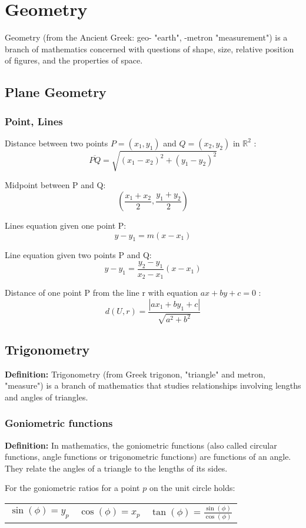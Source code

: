 \chapter{Geometry}
Geometry (from the Ancient Greek: geo- "earth", -metron "measurement") is a branch of mathematics concerned with questions of shape, size, relative position of figures, and the properties of space.


\section{Plane Geometry}
\subsection{Point, Lines}
Distance between two points $P=(x_1,y_1)$ and $Q=(x_2,y_2)$ in $\mathbb{R}^2$ : 
\[ \overline{PQ} = \sqrt{(x_1-x_2)^2+(y_1-y_2)^2} \]

Midpoint between P and Q: 
\[ \left(\frac{x_1+x_2}{2},\frac{y_1+y_2}{2}\right) \]

Lines equation given one point P: 
\[ y-y_1 = m(x-x_1) \]

Line equation given two points P and Q: 
\[ y-y_1 = \frac{y_2-y_1}{x_2-x_1}(x-x_1) \] 

Distance of one point P from the line r with equation $ax+by+c=0$ : 
\[ d(U,r) = \frac{\left|ax_1+by_1+c\right|}{\sqrt{a^2+b^2}} \]


\section{Trigonometry}
\textbf{Definition:} Trigonometry (from Greek trigonon, "triangle" and metron, "measure") is a branch of mathematics that studies relationships involving lengths and angles of triangles.

\subsection{Goniometric functions}
\textbf{Definition:} In mathematics, the goniometric functions (also called circular functions, angle functions or trigonometric functions) are functions of an angle. They relate the angles of a triangle to the lengths of its sides. 

For the goniometric ratios for a point $p$ on the unit circle holds:
\begin{table}[ht!]
\centering
\begin{tabular}{ c | c | c }
$ \displaystyle \sin(\phi)=y_p $   & 
$ \displaystyle \cos(\phi)=x_p $   & 
$ \displaystyle \tan(\phi)=\frac{\sin(\phi)}{\cos(\phi)} $
\end{tabular}
\end{table}


